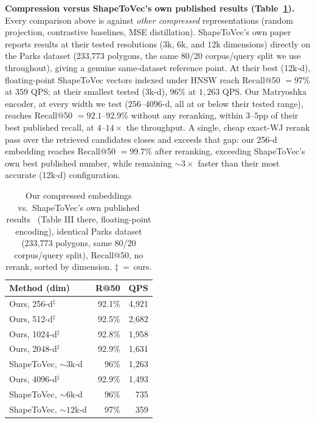 \documentclass[sigconf]{acmart}
\begin{document}
\textbf{Compression versus ShapeToVec's own published results (Table~\ref{tab:uncompressed}).}
Every comparison above is against \emph{other compressed} representations (random
projection, contrastive baselines, MSE distillation). ShapeToVec's own paper~\cite{shape2vec}
reports results at their tested resolutions ($3$k, $6$k, and $12$k dimensions) directly
on the Parks dataset (233,773 polygons, the same 80/20 corpus/query split we use
throughout), giving a genuine same-dataset reference point. At their best (12k-d),
floating-point ShapeToVec vectors indexed under HNSW reach Recall@50 $=97\%$ at $359$
QPS; at their smallest tested (3k-d), $96\%$ at $1{,}263$ QPS. Our Matryoshka encoder, at
every width we test ($256$--$4096$-d, all at or below their tested range), reaches
Recall@50 $=92.1$--$92.9\%$ without any reranking, within $3$--$5$pp of their best
published recall, at $4$--$14\times$ the throughput. A single, cheap exact-WJ rerank
pass over the retrieved candidates closes and exceeds that gap: our 256-d embedding
reaches Recall@50 $=99.7\%$ after reranking, exceeding ShapeToVec's own best published
number, while remaining ${\sim}3\times$ faster than their most accurate (12k-d)
configuration.

\begin{table}[t]\centering
\caption{Our compressed embeddings vs.\ ShapeToVec's own published
results~\cite{shape2vec} (Table III there, floating-point encoding), identical Parks
dataset (233,773 polygons, same 80/20 corpus/query split), Recall@50, no rerank, sorted
by dimension. $\ddagger$~=~ours.}
\label{tab:uncompressed}\setlength{\tabcolsep}{4pt}\small
\begin{tabular}{@{}lrr@{}}
\toprule
Method (dim) & R@50 & QPS \\
\midrule
Ours, 256-d$^\ddagger$  & 92.1\% & 4{,}921 \\
Ours, 512-d$^\ddagger$  & 92.5\% & 2{,}682 \\
Ours, 1024-d$^\ddagger$ & 92.8\% & 1{,}958 \\
Ours, 2048-d$^\ddagger$ & 92.9\% & 1{,}631 \\
ShapeToVec, ${\sim}3$k-d & 96\% & 1{,}263 \\
Ours, 4096-d$^\ddagger$ & 92.9\% & 1{,}493 \\
ShapeToVec, ${\sim}6$k-d & 96\% & 735 \\
ShapeToVec, ${\sim}12$k-d & 97\% & 359 \\
\bottomrule
\end{tabular}
\end{table}
\end{document}
